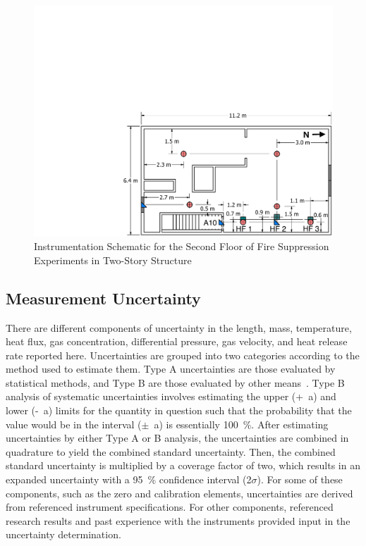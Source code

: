 \documentclass[12pt,oneside]{book}
\begin{document}
\begin{figure}[!ht]
	\includegraphics[width=\columnwidth]{../../DelCo_2014_2015/Drawings/PDFs/CAFS/West_Structure_2nd_Floor_Instrumentation}
	\caption{Instrumentation Schematic for the Second Floor of Fire Suppression Experiments in Two-Story Structure}
	\label{fig:fire_supp_second_2story}
\end{figure}

\clearpage

\subsection{Measurement Uncertainty}
\label{subsec:Uncertainty}

There are different components of uncertainty in the length, mass, temperature, heat flux, gas concentration, differential pressure, gas velocity, and heat release rate reported here. Uncertainties are grouped into two categories according to the method used to estimate them. Type A uncertainties are those evaluated by statistical methods, and Type B are those evaluated by other means~\cite{Taylor&Kuyatt:1994}. Type B analysis of systematic uncertainties involves estimating the upper (+~a) and lower (-~a) limits for the quantity in question such that the probability that the value would be in the interval ($\pm$~a) is essentially 100~\%. After estimating uncertainties by either Type A or B analysis, the uncertainties are combined in quadrature to yield the combined standard uncertainty. Then, the combined standard uncertainty is multiplied by a coverage factor of two, which results in an expanded uncertainty with a 95~\% confidence interval (2$\sigma$). For some of these components, such as the zero and calibration elements, uncertainties are derived from referenced instrument specifications. For other components, referenced research results and past experience with the instruments provided input in the uncertainty determination.
\end{document}
